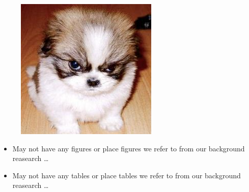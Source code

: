 \documentclass[]{unswthesis}
\begin{document}
\frontmatter  
\maketitle





\tableofcontents
\listoffigures  %

\begin{figure}[ht!]
\graphicspath{{images/} }
\includegraphics{dog.jpg}
\end{figure}

\begin{itemize}
  \item May not have any figures or place figures we refer to from our background reasearch
\ldots
\end{itemize}

\listoftables  %

\begin{itemize}
  \item May not have any tables or place tables we refer to from our background reasearch
\ldots
\end{itemize}

\mainmatter







\backmatter





\end{document}
